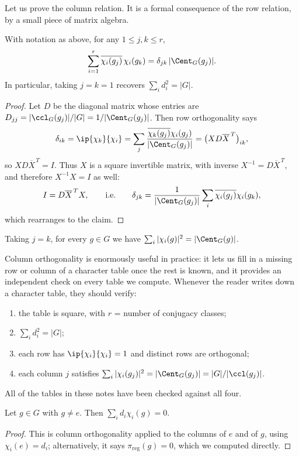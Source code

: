Let us prove the column relation. It is a formal consequence of the row relation, by a small piece of matrix algebra.

\begin{theorem}
	With notation as above, for any $1 \leq j, k \leq r$,
	$$\sum_{i=1}^r \overline{\chi_i(g_j)}\,\chi_i(g_k) = \delta_{jk}\,|\Cent_G(g_j)|.$$
	In particular, taking $j = k = 1$ recovers $\sum_i d_i^2 = |G|$.
\end{theorem}
\begin{proof}
	Let $D$ be the diagonal matrix whose entries are $D_{jj} = |\ccl_G(g_j)|/|G| = 1/|\Cent_G(g_j)|$. Then row orthogonality says
	$$\delta_{ik} = \ip{\chi_k}{\chi_i} = \sum_j \frac{\overline{\chi_k(g_j)}\chi_i(g_j)}{|\Cent_G(g_j)|} = \big(X D \overline{X}^{\,T}\big)_{ik},$$
	so $X D \overline X^{\,T} = I$. Thus $X$ is a square invertible matrix, with inverse $X^{-1} = D\overline X^{\,T}$, and therefore $X^{-1}X = I$ as well:
	$$I = D\overline X^{\,T} X, \qquad \text{i.e.}\qquad \delta_{jk} = \frac{1}{|\Cent_G(g_j)|}\sum_i \overline{\chi_i(g_j)}\chi_i(g_k),$$
	which rearranges to the claim.
\end{proof}

\begin{corollary}
	Taking $j = k$, for every $g \in G$ we have $\sum_i |\chi_i(g)|^2 = |\Cent_G(g)|$.
\end{corollary}

Column orthogonality is enormously useful in practice: it lets us fill in a missing row or column of a character table once the rest is known, and it provides an independent check on every table we compute. Whenever the reader writes down a character table, they should verify:
\begin{enumerate}[label=(\roman*)]
	\item the table is square, with $r$ = number of conjugacy classes;
	\item $\sum_i d_i^2 = |G|$;
	\item each row has $\ip{\chi_i}{\chi_i} = 1$ and distinct rows are orthogonal;
	\item each column $j$ satisfies $\sum_i|\chi_i(g_j)|^2 = |\Cent_G(g_j)| = |G|/|\ccl(g_j)|$.
\end{enumerate}
All of the tables in these notes have been checked against all four.

\begin{corollary}
	Let $g \in G$ with $g \neq e$. Then $\sum_i d_i \chi_i(g) = 0$.
\end{corollary}
\begin{proof}
	This is column orthogonality applied to the columns of $e$ and of $g$, using $\chi_i(e) = d_i$; alternatively, it says $\pi_{\text{reg}}(g) = 0$, which we computed directly.
\end{proof}

